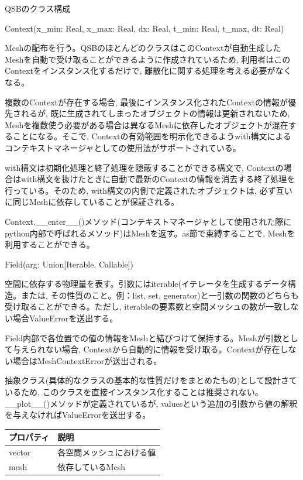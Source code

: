 \documentclass[a4paper, lualatex]{bxjsarticle}
\begin{document}
\begin{section}{QSBのクラス構成\label{AppQ}}
    \begin{subsection}{Context(x\_min: Real, x\_max: Real, dx: Real, t\_min: Real, t\_max, dt: Real)}
        \par Meshの配布を行う。QSBのほとんどのクラスはこのContextが自動生成したMeshを自動で受け取ることができるように作成されているため, 利用者はこのContextをインスタンス化するだけで, 離散化に関する処理を考える必要がなくなる。
        \par 複数のContextが存在する場合, 最後にインスタンス化されたContextの情報が優先されるが, 既に生成されてしまったオブジェクトの情報は更新されないため, Meshを複数使う必要がある場合は異なるMeshに依存したオブジェクトが混在することになる。そこで, Contextの有効範囲を明示化できるようwith構文によるコンテキストマネージャとしての使用法がサポートされている。
        \par with構文は初期化処理と終了処理を隠蔽することができる構文で, Contextの場合はwith構文を抜けたときに自動で最新のContextの情報を消去する終了処理を行っている。そのため, with構文の内側で定義されたオブジェクトは, 必ず互いに同じMeshに依存していることが保証される。
        \par Context.\_\_enter\_\_()メソッド(コンテキストマネージャとして使用された際にpython内部で呼ばれるメソッド)はMeshを返す。as節で束縛することで, Meshを利用することができる。
        
    \end{subsection}

    \begin{subsection}{Field(arg: Union[Iterable, Callable])}
        \par 空間に依存する物理量を表す。引数にはiterable(イテレータを生成するデータ構造。または, その性質のこと。例：list, set, generator)と一引数の関数のどちらも受け取ることができる。ただし, iterableの要素数と空間メッシュの数が一致しない場合ValueErrorを送出する。
        \par Field内部で各位置での値の情報をMeshと結びつけて保持する。Meshが引数として与えられない場合, Contextから自動的に情報を受け取る。Contextが存在しない場合はMeshContextErrorが送出される。
        \par 抽象クラス(具体的なクラスの基本的な性質だけをまとめたもの)として設計さているため, このクラスを直接インスタンス化することは推奨されない。\_\_plot\_\_()メソッドが定義されているが, valuesという追加の引数から値の解釈を与えなければValueErrorを送出する。
         \begin{table}[h]
            \begin{tabular}{ll}
                プロパティ & 説明\\ \hline
                vector & 各空間メッシュにおける値\\
                mesh & 依存しているMesh
            \end{tabular}
        \end{table}
        
    \end{subsection}


\end{section}
\end{document}
